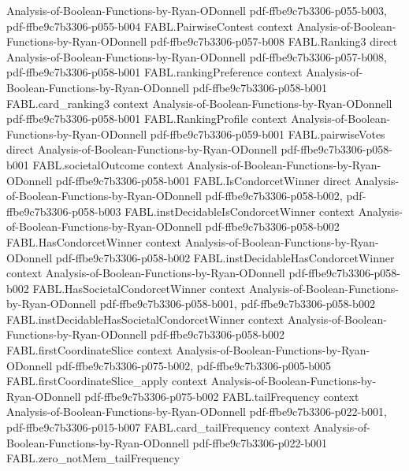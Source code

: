 \begin{theorem}
  {Analysis-of-Boolean-Functions-by-Ryan-ODonnell}
  {pdf-ffbe9c7b3306-p055-b003,
    pdf-ffbe9c7b3306-p055-b004}
\proofstep
  {FABL.PairwiseContest}
  {context}
  {Analysis-of-Boolean-Functions-by-Ryan-ODonnell}
  {pdf-ffbe9c7b3306-p057-b008}
\proofstep
  {FABL.Ranking3}
  {direct}
  {Analysis-of-Boolean-Functions-by-Ryan-ODonnell}
  {pdf-ffbe9c7b3306-p057-b008,
    pdf-ffbe9c7b3306-p058-b001}
\proofstep
  {FABL.rankingPreference}
  {context}
  {Analysis-of-Boolean-Functions-by-Ryan-ODonnell}
  {pdf-ffbe9c7b3306-p058-b001}
\proofstep
  {FABL.card_ranking3}
  {context}
  {Analysis-of-Boolean-Functions-by-Ryan-ODonnell}
  {pdf-ffbe9c7b3306-p058-b001}
\proofstep
  {FABL.RankingProfile}
  {context}
  {Analysis-of-Boolean-Functions-by-Ryan-ODonnell}
  {pdf-ffbe9c7b3306-p059-b001}
\proofstep
  {FABL.pairwiseVotes}
  {direct}
  {Analysis-of-Boolean-Functions-by-Ryan-ODonnell}
  {pdf-ffbe9c7b3306-p058-b001}
\proofstep
  {FABL.societalOutcome}
  {context}
  {Analysis-of-Boolean-Functions-by-Ryan-ODonnell}
  {pdf-ffbe9c7b3306-p058-b001}
\proofstep
  {FABL.IsCondorcetWinner}
  {direct}
  {Analysis-of-Boolean-Functions-by-Ryan-ODonnell}
  {pdf-ffbe9c7b3306-p058-b002,
    pdf-ffbe9c7b3306-p058-b003}
\proofstep
  {FABL.instDecidableIsCondorcetWinner}
  {context}
  {Analysis-of-Boolean-Functions-by-Ryan-ODonnell}
  {pdf-ffbe9c7b3306-p058-b002}
\proofstep
  {FABL.HasCondorcetWinner}
  {context}
  {Analysis-of-Boolean-Functions-by-Ryan-ODonnell}
  {pdf-ffbe9c7b3306-p058-b002}
\proofstep
  {FABL.instDecidableHasCondorcetWinner}
  {context}
  {Analysis-of-Boolean-Functions-by-Ryan-ODonnell}
  {pdf-ffbe9c7b3306-p058-b002}
\proofstep
  {FABL.HasSocietalCondorcetWinner}
  {context}
  {Analysis-of-Boolean-Functions-by-Ryan-ODonnell}
  {pdf-ffbe9c7b3306-p058-b001,
    pdf-ffbe9c7b3306-p058-b002}
\proofstep
  {FABL.instDecidableHasSocietalCondorcetWinner}
  {context}
  {Analysis-of-Boolean-Functions-by-Ryan-ODonnell}
  {pdf-ffbe9c7b3306-p058-b002}
\proofstep
  {FABL.firstCoordinateSlice}
  {context}
  {Analysis-of-Boolean-Functions-by-Ryan-ODonnell}
  {pdf-ffbe9c7b3306-p075-b002,
    pdf-ffbe9c7b3306-p005-b005}
\proofstep
  {FABL.firstCoordinateSlice_apply}
  {context}
  {Analysis-of-Boolean-Functions-by-Ryan-ODonnell}
  {pdf-ffbe9c7b3306-p075-b002}
\proofstep
  {FABL.tailFrequency}
  {context}
  {Analysis-of-Boolean-Functions-by-Ryan-ODonnell}
  {pdf-ffbe9c7b3306-p022-b001,
    pdf-ffbe9c7b3306-p015-b007}
\proofstep
  {FABL.card_tailFrequency}
  {context}
  {Analysis-of-Boolean-Functions-by-Ryan-ODonnell}
  {pdf-ffbe9c7b3306-p022-b001}
\proofstep
  {FABL.zero_notMem_tailFrequency}

\end{theorem}
